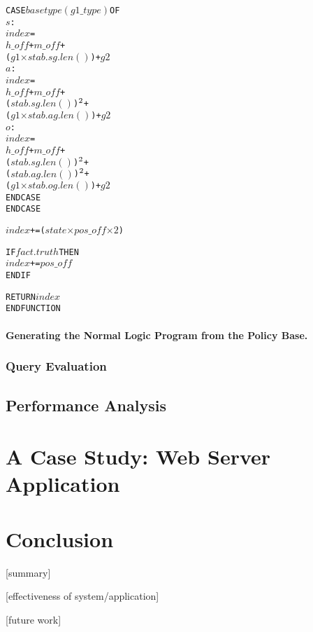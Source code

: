 \documentclass[10pt, twocolumn]{article}
\begin{document}
\begin{alltt}
      CASE \(basetype(g1\_type)\) OF
        \(s\) : 
          \(index\) =
            \(h\_off\) + \(m\_off\) +
            (\(g1\) \(\times\) \(stab.sg.len()\)) + \(g2\)
        \(a\) : 
          \(index\) =
            \(h\_off\) + \(m\_off\) +
            (\(stab.sg.len()\))\(\sp{2}\) +
            (\(g1\) \(\times\) \(stab.ag.len()\)) + \(g2\)
        \(o\) :
          \(index\) =
            \(h\_off\) + \(m\_off\) +
            (\(stab.sg.len()\))\(\sp{2}\) +
            (\(stab.ag.len()\))\(\sp{2}\) +
            (\(g1\) \(\times\) \(stab.og.len()\)) + \(g2\)
      ENDCASE
  ENDCASE

  \(index\) += (\(state\) \(\times\) \(pos\_off\) \(\times\) \(2\))

  IF \(fact.truth\) THEN
    \(index\) += \(pos\_off\)
  ENDIF

  RETURN \(index\)
ENDFUNCTION
          \end{alltt}

        \paragraph{Generating the Normal Logic Program from the Policy Base.}

      \subsubsection{Query Evaluation}

    \subsection{Performance Analysis}

  \section{A Case Study: Web Server Application}

  \section{Conclusion}

    [summary]

    [effectiveness of system/application]

    [future work]
\end{document}
